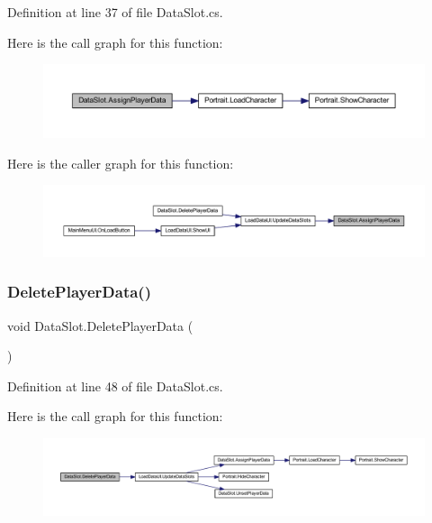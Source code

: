 Definition at line 37 of file Data\+Slot.\+cs.

Here is the call graph for this function\+:
\nopagebreak
\begin{figure}[H]
\begin{center}
\leavevmode
\includegraphics[width=350pt]{class_data_slot_a104284ff9c03da56e871e2f39d345e0b_cgraph}
\end{center}
\end{figure}
Here is the caller graph for this function\+:
\nopagebreak
\begin{figure}[H]
\begin{center}
\leavevmode
\includegraphics[width=350pt]{class_data_slot_a104284ff9c03da56e871e2f39d345e0b_icgraph}
\end{center}
\end{figure}
\mbox{\label{class_data_slot_aae68b8b9d2f07c2d634e82493d29c05d}} 
\subsubsection{\texorpdfstring{DeletePlayerData()}{DeletePlayerData()}}
{\footnotesize\ttfamily void Data\+Slot.\+Delete\+Player\+Data (\begin{DoxyParamCaption}{ }\end{DoxyParamCaption})}



Definition at line 48 of file Data\+Slot.\+cs.

Here is the call graph for this function\+:
\nopagebreak
\begin{figure}[H]
\begin{center}
\leavevmode
\includegraphics[width=350pt]{class_data_slot_aae68b8b9d2f07c2d634e82493d29c05d_cgraph}
\end{center}
\end{figure}
\mbox{\label{class_data_slot_a8c5e92e015138b1ec785465db9ff65a6}} 
